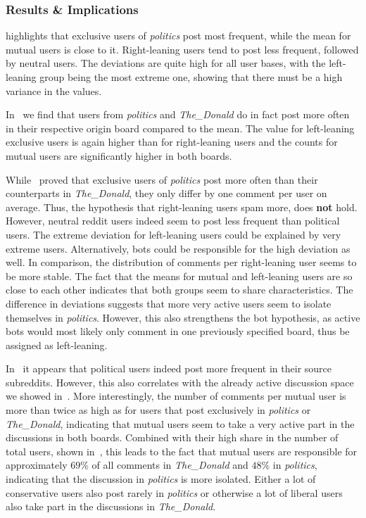 \documentclass[runningheads,a4paper]{llncs}
\newcommand{\boards}[1]{\textit{politics} #1 \textit{The\_Donald}}
\begin{document}
	\subsubsection{Results \& Implications}
	 highlights that exclusive users of \textit{politics} post most frequent, while the mean for mutual users is close to it. Right-leaning users tend to post less frequent, followed by neutral users. The deviations are quite high for all user bases, with the left-leaning group being the most extreme one, showing that there must be a high variance in the values.
	
	In~ we find that users from \boards{and} do in fact post more often in their respective origin board compared to the mean. The value for left-leaning exclusive users is again higher than for right-leaning users and the counts for mutual users are significantly higher in both boards.
	
	
	While~ proved that exclusive users of \textit{politics} post more often than their counterparts in \textit{The\_Donald}, they only differ by one comment per user on average. Thus, the hypothesis that right-leaning users spam more, does \textbf{not} hold. However, neutral reddit users indeed seem to post less frequent than political users. The extreme deviation for left-leaning users could be explained by very extreme users. Alternatively, bots could be responsible for the high deviation as well. In comparison, the distribution of comments per right-leaning user seems to be more stable.
	The fact that the means for mutual and left-leaning users are so close to each other indicates that both groups seem to share characteristics. The difference in deviations suggests that more very active users seem to isolate themselves in \textit{politics}. However, this also strengthens the bot hypothesis, as active bots would most likely only comment in one previously specified board, thus be assigned as left-leaning.
	
	In~ it appears that political users indeed post more frequent in their source subreddits. However, this also correlates with the already active discussion space we showed in~. More interestingly, the number of comments per mutual user is more than twice as high as for users that post exclusively in \boards{or}, indicating that mutual users seem to take a very active part in the discussions in both boards. Combined with their
	high share in the number of total users, shown in~, this leads to the fact that mutual users are responsible for approximately $69\%$ of all comments in \textit{The\_Donald} and $48\%$ in \textit{politics}, indicating that the discussion in \textit{politics} is more isolated. Either a lot of conservative users also post rarely in \textit{politics} or otherwise a lot of liberal users also take part in the discussions in \textit{The\_Donald}.
	
\end{document}
